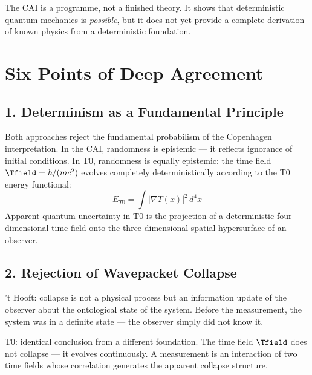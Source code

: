 \begin{keyresult}
    The CAI is a programme, not a finished theory. It shows that deterministic
    quantum mechanics is \emph{possible}, but it does not yet provide a complete
    derivation of known physics from a deterministic foundation.
\end{keyresult}

\clearpage

\section{Six Points of Deep Agreement}
\label{sec:agreement}

\subsection{1. Determinism as a Fundamental Principle}

Both approaches reject the fundamental probabilism of the Copenhagen interpretation.
In the CAI, randomness is epistemic — it reflects ignorance of initial conditions.
In T0, randomness is equally epistemic: the time field
$\Tfield = \hbar / (mc^2)$ evolves completely deterministically according to the
T0 energy functional:
\begin{equation}
    E_{T0} = \int |\nabla T(x)|^2 \, d^4x
    \label{eq:t0_energy}
\end{equation}
Apparent quantum uncertainty in T0 is the projection of a deterministic
four-dimensional time field onto the three-dimensional spatial hypersurface of
an observer.

\subsection{2. Rejection of Wavepacket Collapse}

't Hooft: collapse is not a physical process but an information update of the
observer about the ontological state of the system. Before the measurement, the
system was in a definite state — the observer simply did not know it.

T0: identical conclusion from a different foundation. The time field $\Tfield$
does not collapse — it evolves continuously. A measurement is an interaction
of two time fields whose correlation generates the apparent collapse structure.

